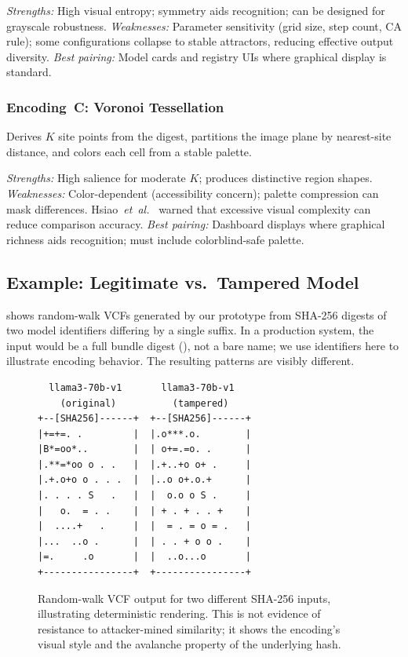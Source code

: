 \documentclass[conference,10pt]{IEEEtran}
\newcommand{\etal}{\textit{et~al.}}
\begin{document}
\smallskip\noindent\textit{Strengths:} High visual entropy; symmetry aids recognition; can be designed for grayscale robustness.
\textit{Weaknesses:} Parameter sensitivity (grid size, step count, CA rule); some configurations collapse to stable attractors, reducing effective output diversity.
\textit{Best pairing:} Model cards and registry UIs where graphical display is standard.

\subsubsection{Encoding~C: Voronoi Tessellation}
Derives $K$ site points from the digest, partitions the image plane by nearest-site distance, and colors each cell from a stable palette.

\smallskip\noindent\textit{Strengths:} High salience for moderate $K$; produces distinctive region shapes.
\textit{Weaknesses:} Color-dependent (accessibility concern); palette compression can mask differences.
Hsiao~\etal~\cite{hsiao2009study} warned that excessive visual complexity can reduce comparison accuracy.
\textit{Best pairing:} Dashboard displays where graphical richness aids recognition; must include colorblind-safe palette.

\subsection{Example: Legitimate vs.\ Tampered Model}

 shows random-walk VCFs generated by our prototype from SHA-256 digests of two model identifiers differing by a single suffix.
In a production system, the input would be a full bundle digest (), not a bare name; we use identifiers here to illustrate encoding behavior.
The resulting patterns are visibly different.

\begin{figure}[t]
\centering
\small
\begin{verbatim}
  llama3-70b-v1       llama3-70b-v1
    (original)          (tampered)
+--[SHA256]------+  +--[SHA256]------+
|+=+=. .         |  |.o***.o.        |
|B*=oo*..        |  | o+=.=o. .      |
|.**=*oo o . .   |  |.+..+o o+ .     |
|.+.o+o o . . .  |  |..o o+.o.+      |
|. . . . S   .   |  |  o.o o S .     |
|   o.  = . .    |  | + . + . . +    |
|  ....+   .     |  |  = . = o = .   |
|...  ..o .      |  | . . + o o .    |
|=.     .o       |  |  ..o...o       |
+----------------+  +----------------+
\end{verbatim}
\caption{Random-walk VCF output for two different SHA-256 inputs, illustrating deterministic rendering. This is not evidence of resistance to attacker-mined similarity; it shows the encoding's visual style and the avalanche property of the underlying hash.}
\label{fig:ascii}
\end{figure}
\end{document}
